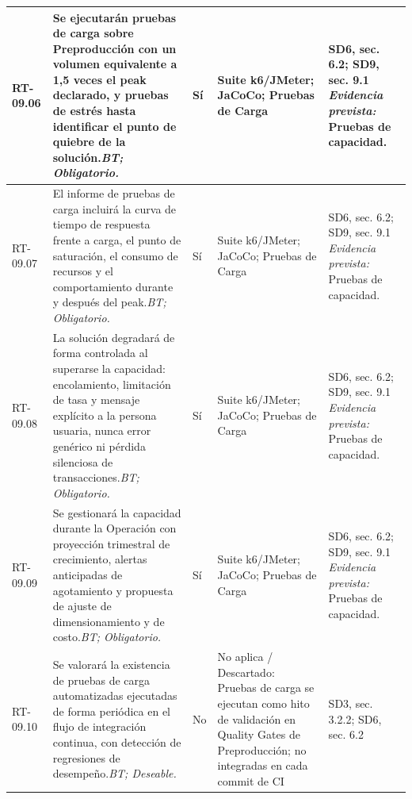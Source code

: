 \begin{paginaHorizontalSynaptix}
\begin{longtable}{|L{0.09\AnchoMatrizTDoce}|L{0.385\AnchoMatrizTDoce}|L{0.065\AnchoMatrizTDoce}|L{0.18\AnchoMatrizTDoce}|L{0.28\AnchoMatrizTDoce}|}
RT-\allowbreak{}09.\allowbreak{}06 &
Se ejecutarán pruebas de carga sobre Preproducción con un volumen equivalente a 1,5 veces el peak declarado, y pruebas de estrés hasta identificar el punto de quiebre de la solución.\newline\textit{BT; Obligatorio.} &
Sí &
Suite k6/JMeter; JaCoCo; Pruebas de Carga &
SD6, sec. 6.2; SD9, sec. 9.1 \newline\textit{Evidencia prevista:} Pruebas de capacidad. \\ \hline

RT-\allowbreak{}09.\allowbreak{}07 &
El informe de pruebas de carga incluirá la curva de tiempo de respuesta frente a carga, el punto de saturación, el consumo de recursos y el comportamiento durante y después del peak.\newline\textit{BT; Obligatorio.} &
Sí &
Suite k6/JMeter; JaCoCo; Pruebas de Carga &
SD6, sec. 6.2; SD9, sec. 9.1 \newline\textit{Evidencia prevista:} Pruebas de capacidad. \\ \hline

RT-\allowbreak{}09.\allowbreak{}08 &
La solución degradará de forma controlada al superarse la capacidad: encolamiento, limitación de tasa y mensaje explícito a la persona usuaria, nunca error genérico ni pérdida silenciosa de transacciones.\newline\textit{BT; Obligatorio.} &
Sí &
Suite k6/JMeter; JaCoCo; Pruebas de Carga &
SD6, sec. 6.2; SD9, sec. 9.1 \newline\textit{Evidencia prevista:} Pruebas de capacidad. \\ \hline

RT-\allowbreak{}09.\allowbreak{}09 &
Se gestionará la capacidad durante la Operación con proyección trimestral de crecimiento, alertas anticipadas de agotamiento y propuesta de ajuste de dimensionamiento y de costo.\newline\textit{BT; Obligatorio.} &
Sí &
Suite k6/JMeter; JaCoCo; Pruebas de Carga &
SD6, sec. 6.2; SD9, sec. 9.1 \newline\textit{Evidencia prevista:} Pruebas de capacidad. \\ \hline

RT-\allowbreak{}09.\allowbreak{}10 &
Se valorará la existencia de pruebas de carga automatizadas ejecutadas de forma periódica en el flujo de integración continua, con detección de regresiones de desempeño.\newline\textit{BT; Deseable.} &
No &
No aplica / Descartado: Pruebas de carga se ejecutan como hito de validación en Quality Gates de Preproducción; no integradas en cada commit de CI &
SD3, sec. 3.2.2; SD6, sec. 6.2 \\ \hline


\end{longtable}
\end{paginaHorizontalSynaptix}
